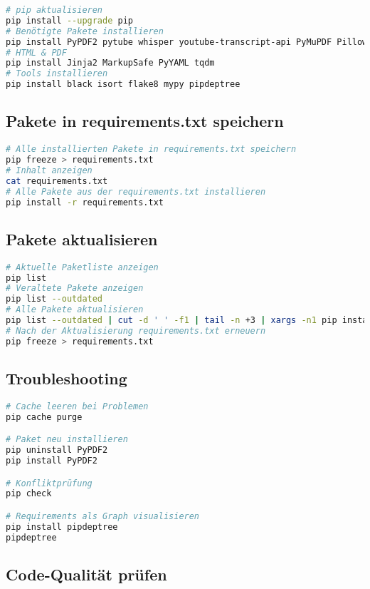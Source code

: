 \documentclass{vorlage-design-main}
\begin{document}
\begin{lstlisting}[language=bash]
# pip aktualisieren
pip install --upgrade pip
# Benötigte Pakete installieren
pip install PyPDF2 pytube whisper youtube-transcript-api PyMuPDF Pillow rich
# HTML & PDF
pip install Jinja2 MarkupSafe PyYAML tqdm 
# Tools installieren
pip install black isort flake8 mypy pipdeptree
\end{lstlisting}

\subsection{Pakete in requirements.txt
speichern}\label{pakete-in-requirements.txt-speichern}

\begin{lstlisting}[language=bash]
# Alle installierten Pakete in requirements.txt speichern
pip freeze > requirements.txt
# Inhalt anzeigen
cat requirements.txt
# Alle Pakete aus der requirements.txt installieren
pip install -r requirements.txt
\end{lstlisting}

\subsection{Pakete aktualisieren}\label{pakete-aktualisieren}

\begin{lstlisting}[language=bash]
# Aktuelle Paketliste anzeigen
pip list
# Veraltete Pakete anzeigen
pip list --outdated
# Alle Pakete aktualisieren
pip list --outdated | cut -d ' ' -f1 | tail -n +3 | xargs -n1 pip install -U
# Nach der Aktualisierung requirements.txt erneuern
pip freeze > requirements.txt
\end{lstlisting}

\subsection{Troubleshooting}\label{troubleshooting}

\begin{lstlisting}[language=bash]
# Cache leeren bei Problemen
pip cache purge

# Paket neu installieren
pip uninstall PyPDF2
pip install PyPDF2

# Konfliktprüfung
pip check

# Requirements als Graph visualisieren
pip install pipdeptree
pipdeptree
\end{lstlisting}

\subsection{Code-Qualität prüfen}\label{code-qualitaet-pruefen}
\end{document}
